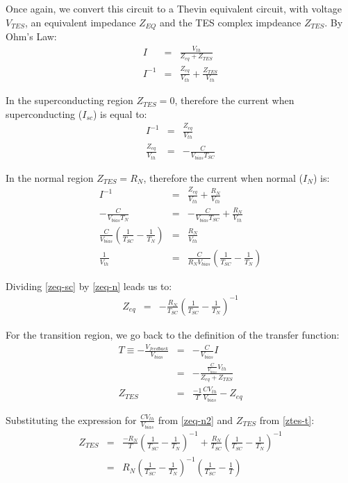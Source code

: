 \documentclass[letterpaper,10pt]{article}
\begin{document}
Once again, we convert this circuit to a Thevin equivalent circuit, with voltage $V_{TES}$, an equivalent impedance $Z_{EQ}$ and the TES complex impdeance $Z_{TES}$. By Ohm's Law:
\begin{eqnarray}
	I &=& \frac{V_{th}}{Z_{eq} + Z_{TES}} \\
	I^{-1} &=& \frac{Z_{eq}}{V_{th}} + \frac{Z_{TES}}{V_{th}} 
\end{eqnarray}

In the superconducting region $Z_{TES} = 0$, therefore the current when superconducting ($I_{sc}$) is equal to:
\begin{eqnarray}
	I^{-1} &=& \frac{Z_{eq}}{V_{th}} \\
	\frac{Z_{eq}}{V_{th}} &=& - \frac{C}{V_{bias} T_{SC}} \label{zeq-sc}
\end{eqnarray}

In the normal region $Z_{TES} = R_N$, therefore the current when normal ($I_N$) is:
\begin{eqnarray}
	I^{-1} &=& \frac{Z_{eq}}{V_{th}} + \frac{R_N}{V_{th}} \\
	- \frac{C}{V_{bias} T_N} &=& - \frac{C}{V_{bias} T_{SC}} + \frac{R_N}{V_{th}} \\
	\frac{C}{V_{bias}} \left( \frac{1}{T_{SC}} - \frac{1}{T_N} \right) &=& \frac{R_N}{V_{th}} \label{zeq-n2}\\
	\frac{1}{V_{th}} &=& \frac{C}{R_N V_{bias}} \left( \frac{1}{T_{SC}} - \frac{1}{T_N} \right) \label{zeq-n}
\end{eqnarray}

Dividing \eqref{zeq-sc} by \eqref{zeq-n} leads us to:
\begin{eqnarray}
	Z_{eq} &=& - \frac{R_N}{T_{SC}} \left( \frac{1}{T_{SC}} - \frac{1}{T_N} \right)^{-1}
\end{eqnarray}

For the transition region, we go back to the definition of the transfer function:
\begin{eqnarray}
	T \equiv -\frac{V_{feedback}}{V_{bias}} &=& -\frac{C}{V_{bias}} I \\
	 &=& -\frac{\frac{C}{V_{bias}} V_{th}}{Z_{eq} + Z_{TES}} \\
	Z_{TES} &=& \frac{-1}{T} \frac{C V_{th}}{V_{bias}} - Z_{eq} \label{ztes-t}
\end{eqnarray}

Substituting the expression for $\frac{C V_{th}}{V_{bias}}$ from \eqref{zeq-n2} and $Z_{TES}$ from \eqref{ztes-t}:
\begin{eqnarray}
	Z_{TES} &=& \frac{-R_N}{T}\left( \frac{1}{T_{SC}} - \frac{1}{T_N} \right)^{-1} + \frac{R_N}{T_{SC}} \left( \frac{1}{T_{SC}} - \frac{1}{T_N} \right)^{-1} \\
		&=& R_N \left( \frac{1}{T_{SC}} - \frac{1}{T_N} \right)^{-1} \left( \frac{1}{T_{SC}} - \frac{1}{T} \right)
\end{eqnarray}
\end{document}
